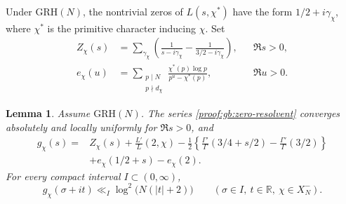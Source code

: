 \documentclass[12pt,a4paper]{amsart}
\numberwithin{equation}{section}
\theoremstyle{plain}
\newtheorem{lemma}[proposition]{Lemma}
\theoremstyle{definition}
\theoremstyle{remark}
\begin{document}
Under $\mathrm{GRH}(N)$, the nontrivial zeros of $L(s,\chi^*)$
have the form $1/2+i\gamma_\chi$, where $\chi^*$ is the primitive
character inducing $\chi$. Set
\begin{align}
 Z_\chi(s)&=\sum_{\gamma_\chi}
   \left(\frac1{s-i\gamma_\chi}-\frac1{3/2-i\gamma_\chi}\right),
       &&\Re s>0,\label{proof:gb:zero-resolvent}\\
 e_\chi(u)&=\sum_{\substack{p\mid N\\p\nmid d_\chi}}
       \frac{\chi^*(p)\log p}{p^u-\chi^*(p)},
       &&\Re u>0.\label{proof:gb:Euler-correction}
\end{align}

\begin{lemma}\label{proof:lem:zero-expansion}
Assume $\mathrm{GRH}(N)$. The series \eqref{proof:gb:zero-resolvent}
converges absolutely and locally uniformly for $\Re s>0$, and
\begin{equation}\label{proof:gb:zero-identity}
 \begin{split}
 g_\chi(s)={}&Z_\chi(s)+\frac{L'}L(2,\chi)
 -\frac12\left\{\frac{\Gamma'}\Gamma(3/4+s/2)
                       -\frac{\Gamma'}\Gamma(3/2)\right\}\\
 &+e_\chi(1/2+s)-e_\chi(2).
 \end{split}
\end{equation}
For every compact interval $I\subset(0,\infty)$,
\begin{equation}\label{proof:gb:logderivative-bound}
 g_\chi(\sigma+it)\ll_I\log^2\bigl(N(|t|+2)\bigr)
 \qquad(\sigma\in I,\ t\in\mathbb R,\ \chi\in X_N^-).
\end{equation}
\end{lemma}
\end{document}
